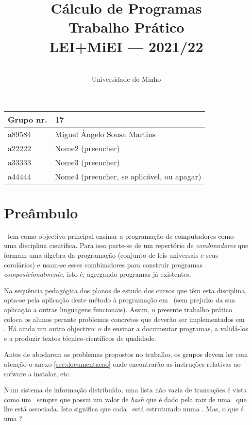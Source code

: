 \documentclass[a4paper]{article}
\title{
          Cálculo de Programas
\\
          Trabalho Prático
\\
          LEI+MiEI --- 2021/22
}
\author{
          \dium
\\
          Universidade do Minho
}
\date\mydate
\begin{document}
\maketitle

\begin{center}\large
\begin{tabular}{ll}
\textbf{Grupo} nr. & 17
\\\hline
a89584 & Miguel Ângelo Sousa Martins
\\
a22222 & Nome2 (preencher)
\\
a33333 & Nome3 (preencher)
\\
a44444 & Nome4 (preencher, se aplicável, ou apagar)
\end{tabular}
\end{center}

\section{Preâmbulo}

\CP\ tem como objectivo principal ensinar
a progra\-mação de computadores como uma disciplina científica. Para isso
parte-se de um repertório de \emph{combinadores} que formam uma álgebra da
programação (conjunto de leis universais e seus corolários) e usam-se esses
combinadores para construir programas \emph{composicionalmente}, isto é,
agregando programas já existentes.

Na sequência pedagógica dos planos de estudo dos cursos que têm
esta disciplina, opta-se pela aplicação deste método à programação
em \Haskell\ (sem prejuízo da sua aplicação a outras linguagens
funcionais). Assim, o presente trabalho prático coloca os
alunos perante problemas concretos que deverão ser implementados em
\Haskell.  Há ainda um outro objectivo: o de ensinar a documentar
programas, a validá-los e a produzir textos técnico-científicos de
qualidade.

Antes de abodarem os problemas propostos no trabalho, os grupos devem ler
com atenção o anexo \ref{sec:documentacao} onde encontrarão as instruções
relativas ao sofware a instalar, etc.


\Problema

Num sistema de informação distribuído, uma lista não vazia de transações
é vista como um \textit\blockchain\ sempre que possui um valor de \textit{hash}
que é dado pela raiz de uma \MerkleTree\ que lhe está associada. Isto significa
que cada \textit\blockchain\ está estruturado numa \MerkleTree.
Mas, o que é uma \MerkleTree?
\end{document}
